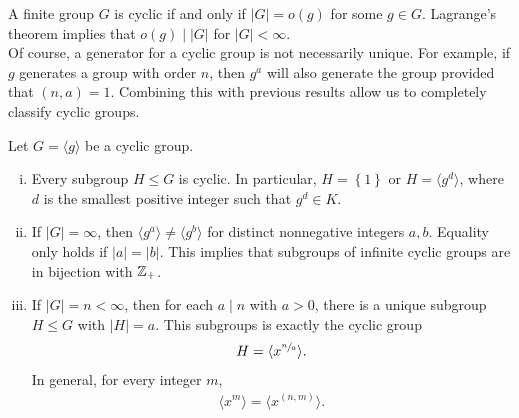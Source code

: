 \documentclass{memoir}
\begin{document}
A finite group \(G\) is cyclic if and only if \(\left| G \right| = o(g)\) for some \(g \in G\). Lagrange's theorem implies that \(o(g) \mid \left| G \right| \) for \(\left| G \right| <\infty\).\\

Of course, a generator for a cyclic group is not necessarily unique. For example, if \(g\) generates a group with order \(n\), then \(g^{a}\) will also generate the group provided that \((n,a) = 1\). Combining this with previous results allow us to completely classify cyclic groups.

\begin{thm}
	Let \(G = \langle g \rangle \) be a cyclic group.
	\begin{enumerate}[(i).]
		\item Every subgroup \(H\leq G\) is cyclic. In particular,  \(H = \left\{ 1 \right\} \) or \(H = \langle g^{d} \rangle \), where \(d\) is the smallest positive integer such that \(g^{d} \in K\).
		\item If \(\left| G \right| = \infty\), then \(\langle g^{a} \rangle \neq \langle g^{b} \rangle  \) for distinct nonnegative integers \(a,b\). Equality only holds if \(\left| a \right| = \left| b \right| \). This implies that subgroups of infinite cyclic groups are in bijection with \(\mathbb{Z}_+\).
		\item If \(\left| G \right|=n <\infty\), then for each \(a\mid n\) with \(a>0\), there is a unique subgroup \(H\leq G\) with \(\left| H \right| =a\). This subgroups is exactly the cyclic group
			\begin{align*}
				H = \langle x^{\sfrac{n}{a}} \rangle .
			\end{align*}
			In general, for every integer \(m\),
			\begin{align*}
				\langle x^{m} \rangle = \langle x^{(n,m)} \rangle .
			\end{align*}
	\end{enumerate}
\end{thm}

\end{document}
